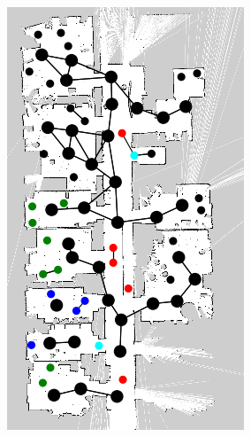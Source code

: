 \documentclass[10pt, titlepage]{article}
\theoremstyle{definition}
\begin{document}
\begin{figure}[!htb]
\begin{subfigure}{.3\textwidth}
  \includegraphics[width=.77\linewidth]{images/partition_by_template_topo_map}
  \caption{}
  \label{fig:part_tmpl}
\end{subfigure}
\begin{subfigure}{.3\textwidth}
  \centering

\end{subfigure}
\end{figure}
\end{document}
